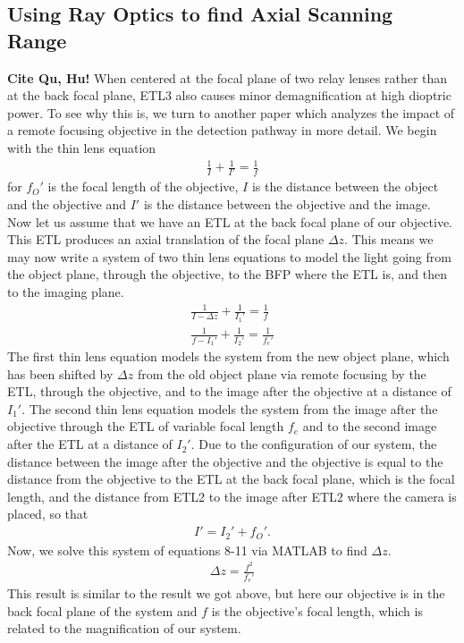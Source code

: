 \subsection{Using Ray Optics to find Axial Scanning Range}
\textbf{Cite Qu, Hu!} When centered at the focal plane of two relay lenses rather than at the back focal plane, ETL3 also causes minor demagnification at high dioptric power. To see why this is, we turn to another paper which analyzes the impact of a remote focusing objective in the detection pathway in more detail. We begin with the thin lens equation
\begin{gather}
	\frac{1}{I} + \frac{1}{I'} = \frac 1 f
\end{gather}
for $f_O'$ is the focal length of the objective, $I$ is the distance between the object and the objective and $I'$ is the distance between the objective and the image. Now let us assume that we have an ETL at the back focal plane of our objective. This ETL produces an axial translation of the focal plane $\Delta z$. This means we may now write a system of two thin lens equations to model the light going from the object plane, through the objective, to the BFP where the ETL is, and then to the imaging plane.
\begin{gather}
	\frac{1}{I-\Delta z} + \frac{1}{I_1'}  = \frac 1{f}\\
	\frac{1}{f -I_1'}+\frac{1}{I_2'} = \frac{1}{f_e'}
\end{gather}
The first thin lens equation models the system from the new object plane, which has been shifted by $\Delta z$ from the old object plane via remote focusing by the ETL, through the objective, and to the image after the objective at a distance of $I_1'$. The second thin lens equation models the system from the image after the objective through the ETL of variable focal length $f_e$ and to the second image after the ETL at a distance of $I_2'$. Due to the configuration of our system, the distance between the image after the objective and the objective is equal to the distance from the objective to the ETL at the back focal plane, which is the focal length, and the distance from ETL2 to the image after ETL2 where the camera is placed, so that
\begin{gather}
	I' = I_2' + f_O'.
\end{gather}
Now, we solve this system of equations 8-11 via MATLAB to find $\Delta z$.
\begin{gather}
	\Delta z = \frac{f^2}{f_e'}
\end{gather}
This result is similar to the result we got above, but here our objective is in the back focal plane of the system and $f$ is the objective's focal length, which is related to the magnification of our system. 

